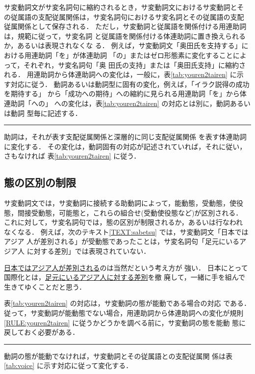 サ変動詞文がサ変名詞句に縮約されるとき，サ変動詞文におけるサ変動詞とそ
の従属語の支配従属関係は，サ変名詞句におけるサ変名詞とその従属語の支配
従属関係として保存される．
ただし，サ変動詞と従属語を関係付ける用連助詞は，規範に従って，サ変名詞
と従属語を関係付ける体連助詞に置き換えられるか，あるいは表現されなくな
る．
例えば，サ変動詞文「奥田氏を支持する」における用連助詞「を」が体連助詞
「の」またはゼロ形態素に変化することによって，それぞれ，サ変名詞句「奥
田氏の支持」または「奥田氏支持」に縮約される．
用連助詞から体連助詞への変化は，一般に，表\ref{tab:youren2tairen} に示
す対応に従う．
動詞あるいは動詞型に固有の変化，例えば，「イラク説得の成功を期待する」
から「成功への期待」への縮約に見られる用連助詞「を」から体連助詞「への」
への変化は，表\ref{tab:youren2tairen} の対応とは別に，動詞あるいは動詞
型毎に記述する．
\begin{RULE}
\rule 用連助詞は，それが表す支配従属関係と深層的に同じ支配従属関係
\footnotemark
を表す体連助詞に変化する．
その変化は，動詞固有の対応が記述されていれば，それに従い，さもなければ
表\ref{tab:youren2tairen} に従う．\label{RULE:youren2tairen}
\end{RULE}


\subsection{態の区別の制限}

サ変動詞文では，サ変動詞に接続する助動詞によって，能動態，受動態，使役
態，間接受動態，可能態と，これらの組合せ(受動使役態など)が区別される．
これに対して，サ変名詞句では，態の区別が制限されるか，あるいは行なわれ
なくなる．
例えば，次のテキスト\ref{TEXT:sabetsu} では，サ変動詞文「日本ではアジア
人が差別される」が受動態であったことは，サ変名詞句「足元にいるアジア人
に対する差別」では表現されていない．
\begin{TEXT}
\text \underline{日本ではアジア人が差別される}のは当然だという考え方が
強い．
日本にとって国際化とは，\underline{足元にいるアジア人に対する差別}を撤
廃して，一緒に手を組んで生きてゆくことだと思う．\label{TEXT:sabetsu}
\end{TEXT}

表\ref{tab:youren2tairen} の対応は，サ変動詞の態が能動である場合の対応
である．
従って，サ変動詞が能動態でない場合，用連助詞から体連助詞への変化が規則
\ref{RULE:youren2tairen} に従うかどうかを調べる前に，サ変動詞の態を能動
態に戻しておく必要がある．
\begin{RULE}
\rule サ変動詞の態が能動でなければ，サ変動詞とその従属語との支配従属関
係は表\ref{tab:voice} に示す対応に従って変化する．\label{RULE:voice}
\end{RULE}


